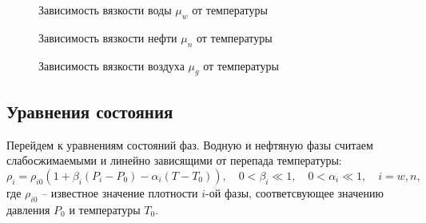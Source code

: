 \begin{figure}[h]
\begin{minipage}[h]{0.49\linewidth}
\caption{Зависимость вязкости воды $\mu_w$ от температуры}
\label{tikz_mu_w}
\end{minipage}
\hfill
\begin{minipage}[h]{0.49\linewidth}
\caption{Зависимость вязкости нефти $\mu_n$ от температуры}
\label{tikz_mu_n}
\end{minipage}
\end{figure}

\begin{figure}[h]
\begin{center}
\caption{Зависимость вязкости воздуха $\mu_g$ от температуры}
\label{tikz_mu_g}
\end{center}
\end{figure}

\subsection{Уравнения состояния}
Перейдем к уравнениям состояний фаз.
Водную и нефтяную фазы считаем слабосжимаемыми и линейно зависящими от перепада температуры:\\
$${\rho}_i = {\rho}_{i0} {(1 + {\beta}_i (P_i-P_0) - {\alpha}_i (T-T_0))},
{\quad}0<{\beta}_{i}{\ll}1,{\quad}0<{\alpha}_{i}{\ll}1,{\quad}i=w,n,$$
где ${\rho}_{i0}$ -- известное значение плотности $i$-ой фазы, соответсвующее
значению давления $P_0$ и температуры $T_0$.

